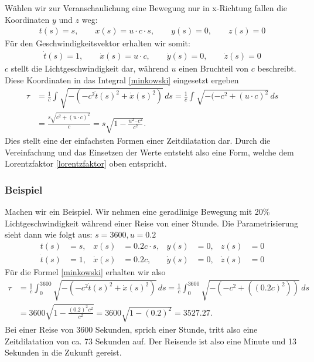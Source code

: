 \begin{refsection}
Wählen wir zur Veranschaulichung eine Bewegung nur in x-Richtung fallen die Koordinaten $y$ und $z$ weg:
\begin{align*}
     t(s)= s,
 	 \qquad x(s)=u\cdot c \cdot s,
     \qquad y(s)=0,
     \qquad z(s)=0 
\end{align*}
Für den Geschwindigkeitsvektor erhalten wir somit:
\begin{align*}
     \dot{t}(s)=1,
     \qquad\dot{x}(s)=u\cdot c,
     \qquad\dot{y}(s)=0,
     \qquad\dot{z}(s)=0
\end{align*}
$c$ stellt die Lichtgeschwindigkeit dar, während $u$ einen Bruchteil von $c$ beschreibt.
Diese Koordinaten in das Integral \ref{minkowski} eingesetzt ergeben
\begin{align*}
\tau
&=
\frac{1}{c}\int_{}^{}\sqrt{-(-c^2\dot{t}(s)^2+\dot{x}(s)^2)}\,ds 
=
\frac{1}{c}\int_{}^{}\sqrt{-(-c^2 +(u\cdot c)^{2}}\,ds\\
&=
\frac{s\sqrt{c^2+(u\cdot c)^{2}}}{c} 
=
s\sqrt{1-\frac{u^2\cdot c^2}{c^2}}.
\end{align*}
Dies stellt eine der einfachsten Formen einer Zeitdilatation dar. Durch die Vereinfachung und das Einsetzen der Werte entsteht also eine Form, welche dem Lorentzfaktor \eqref{lorentzfaktor} oben entspricht.

\subsubsection{Beispiel}
Machen wir ein Beispiel. Wir nehmen eine geradlinige Bewegung mit 20\% Lichtgeschwindigkeit während einer Reise von einer Stunde. Die Parametrisierung sieht dann wie folgt aus:
$s=3600, u=0.2$ 
\[
\begin{aligned}
t(s)&=s, & x(s)&=0.2c \cdot s, & y(s)&=0, & z(s)&=0 \\
\dot{t}(s)&=1, & \dot{x}(s)&=0.2c, & \dot{y}(s)&=0, & \dot{z}(s)&=0
\end{aligned}
\]
Für die Formel \eqref{minkowski} erhalten wir also
\begin{align*}
 \tau
&=
\frac{1}{c}\int_{0}^{3600}\sqrt{-(-c^2\dot{t}(s)^2+\dot{x}(s)^2)}\,ds
=
\frac{1}{c}\int_{0}^{3600}\sqrt{-(-c^2+((0.2c)^2))}\,ds\\
&=
3600\sqrt{1-\frac{(0.2)^2 c^2}{c^2}} 
=
3600\sqrt{1-(0.2)^2}
=
3527.27.
\end{align*}
Bei einer Reise von 3600 Sekunden, sprich einer Stunde, tritt also eine Zeitdilatation von ca. 73 Sekunden auf. Der Reisende ist also eine Minute und 13 Sekunden in die Zukunft gereist.


\end{refsection}
